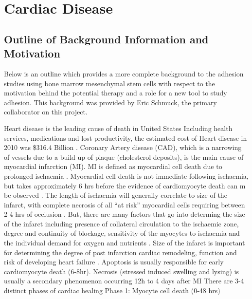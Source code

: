 \chapter{Cardiac Disease}
\label{App:Cardiac}

\section{Outline of Background Information and Motivation}
Below is an outline which provides a more complete background to the adhesion studies using bone marrow mesenchymal stem cells with respect to the motivation behind the potential therapy and a role for a new tool to study adhesion. This background was provided by Eric Schmuck, the primary collaborator on this project.
\begin{outline}
\1 Heart disease is the leading cause of death in United States \cite{Heron:2009kx}
\1Including health services, medications and lost productivity, the estimated cost of Heart disease in 2010 was \$316.4 Billion \cite{Lloyd-Jones:2010vn}.
\1 Coronary Artery disease (CAD), which is a narrowing of vessels due to a build up of plaque (cholesterol deposits), is the main cause of myocardial infarction (MI).
\1 MI is defined as myocardial cell death due to prolonged ischaemia \cite{Thygesen:2007ys}.
\1 Myocardial cell death is not immediate following ischaemia, but takes approximately 6 hrs before the evidence of cardiomyocyte death can m be observed \cite{Thygesen:2007ys,Blankesteijn:2001zr}.
\1The length of ischaemia will generally correlate to size of the infarct, with complete necrosis of all “at risk” myocardial cells requiring between 2-4 hrs of occlusion \cite{Thygesen:2007ys}. But, there are many factors that go into determing the size of the infarct including presence of collateral circulation to the ischaemic zone, degree and continuity of blockage, sensitivity of the myocytes to ischaemia and the individual demand for oxygen and nutrients  \cite{Thygesen:2007ys,Alpert:2000ly}.
\1 Size of the infarct is important for determining the degree of post infarction cardiac remodeling, function and risk of developing heart failure \cite{Forrester:1976bh,McKay:1986ve,Pfeffer:1979qf}.
\1 Apoptosis is usually responsible for early cardiomyocyte death (6-8hr).  Necrosis (stressed induced swelling and lysing) is usually a secondary phenomenon occurring 12h to 4 days after MI \cite{Blankesteijn:2001zr}
\1There are 3-4 distinct phases of cardiac healing \cite{Cleutjens:1999fk,Frangogiannis:2008uq}
\2 Phase 1: Myocyte cell death (0-48 hrs)

\end{outline}
